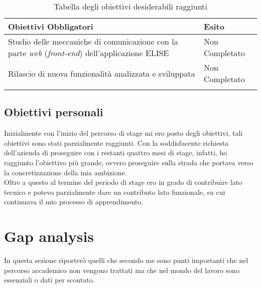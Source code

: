 	\begin{center}
		  \bgroup
		  \def\arraystretch{1.4}
		   \begin{longtable}{ | p{9cm} | p{2cm} | }  \hline
			 
			 \cellcolor[gray]{0.9} \textbf{Obiettivi Obbligatori} & \cellcolor[gray]{0.9} \textbf{Esito} \\ \hline
						 
			Studio delle meccaniche di comunicazione con la parte \textit{web} (\textit{front-end}) dell'applicazione ELISE & Non Completato  \\ \hline
			Rilascio di nuova funzionalità analizzata e sviluppata  & Non Completato  \\ \hline

			
			\caption{Tabella degli obiettivi desiderabili raggiunti}
			
		    \end{longtable}
		  \egroup
		\end{center}

\subsection{Obiettivi personali}
Inizialmente con l'inizio del percorso di stage mi ero posto degli obiettivi, tali obiettivi sono stati parzialmente raggiunti. Con la soddisfacente richiesta dell'azienda di proseguire con i restanti quattro mesi di stage, infatti, ho raggiunto l'obiettivo più grande, ovvero proseguire sulla strada che portava verso la concretizzazione della mia ambizione.\\

Oltre a questo al termine del periodo di stage ero in grado di contribuire lato tecnico e potevo parzialmente dare un contributo lato funzionale, su cui continuava il mio processo di apprendimento.

\section{Gap analysis}
In questa sezione riporterò quelli che secondo me sono punti importanti che nel percorso accademico non vengono trattati ma che nel mondo del lavoro sono essenziali o dati per scontato.